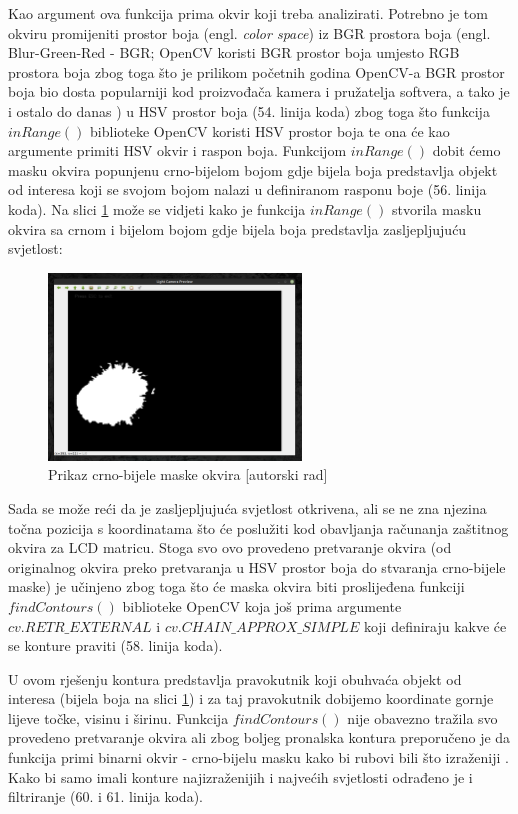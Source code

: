 \documentclass{foi}
\begin{document}
Kao argument ova funkcija prima okvir koji treba analizirati. Potrebno je tom okviru promijeniti prostor boja (engl. \emph{color space}) iz BGR prostora boja (engl. Blur-Green-Red - BGR; OpenCV koristi BGR prostor boja umjesto RGB prostora boja zbog toga što je prilikom početnih godina OpenCV-a BGR prostor boja bio dosta popularniji kod proizvođača kamera i pružatelja softvera, a tako je i ostalo do danas \cite{Satya}) u HSV prostor boja (54. linija koda) zbog toga što funkcija $inRange()$ biblioteke OpenCV koristi HSV prostor boja te ona će kao argumente primiti HSV okvir i raspon boja. Funkcijom $inRange()$ dobit ćemo masku okvira popunjenu crno-bijelom bojom gdje bijela boja predstavlja objekt od interesa koji se svojom bojom nalazi u definiranom rasponu boje \cite{OpenCV3} (56. linija koda). Na slici \ref{fig:maska} može se vidjeti kako je funkcija $inRange()$ stvorila masku okvira sa crnom i bijelom bojom gdje bijela boja predstavlja zasljepljujuću svjetlost:

\begin{figure}[h!]
    \centering
    \includegraphics[width=0.6\textwidth]{slike/cb_maska_okvir}
    \caption{Prikaz crno-bijele maske okvira [autorski rad]}
    \label{fig:maska}
\end{figure}

Sada se može reći da je zasljepljujuća svjetlost otkrivena, ali se ne zna njezina točna pozicija s koordinatama što će poslužiti kod obavljanja računanja zaštitnog okvira za LCD matricu. Stoga svo ovo provedeno pretvaranje okvira (od originalnog okvira preko pretvaranja u HSV prostor boja do stvaranja crno-bijele maske) je učinjeno zbog toga što će maska okvira biti proslijeđena funkciji $findContours()$ biblioteke OpenCV koja još prima argumente $cv.RETR\_EXTERNAL$ i $cv.CHAIN\_APPROX\_SIMPLE$ koji definiraju kakve će se konture praviti (58. linija koda).

U ovom rješenju kontura predstavlja pravokutnik koji obuhvaća objekt od interesa (bijela boja na slici \ref{fig:maska}) i za taj pravokutnik dobijemo koordinate gornje lijeve točke, visinu i širinu. Funkcija $findContours()$ nije obavezno tražila svo provedeno pretvaranje okvira ali zbog boljeg pronalska kontura preporučeno je da funkcija primi binarni okvir - crno-bijelu masku kako bi rubovi bili što izraženiji \cite{OpenCV4}. Kako bi samo imali konture najizraženijih i najvećih svjetlosti odrađeno je i filtriranje (60. i 61. linija koda).
\end{document}
